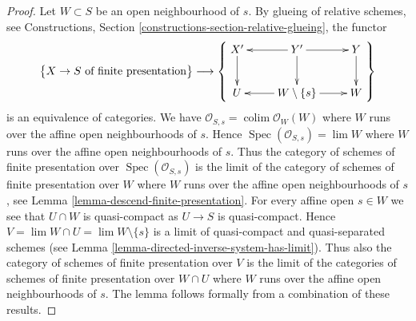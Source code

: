 \documentclass[10pt,a4paper]{amsart}
\theoremstyle{plain}
\theoremstyle{definition}
\theoremstyle{remark}
\numberwithin{equation}{subsection}
\def\lim{\mathop{\mathrm{lim}}\nolimits}
\def\colim{\mathop{\mathrm{colim}}\nolimits}
\def\Spec{\mathop{\mathrm{Spec}}}
\begin{document}
\begin{proof}
Let $W \subset S$ be an open neighbourhood of $s$. By
glueing of relative schemes, see
Constructions, Section \ref{constructions-section-relative-glueing},
the functor
$$
\left\{
\begin{matrix}
X \to S\text{ of finite presentation}
\end{matrix}
\right\}
\longrightarrow
\left\{
\vcenter{
\xymatrix{
X' \ar[d] & Y' \ar[d] \ar[l] \ar[r] & Y \ar[d] \\
U & W \setminus \{s\} \ar[l] \ar[r] & W
}
}
\right\}
$$
is an equivalence of categories. We have
$\mathcal{O}_{S, s} = \colim \mathcal{O}_W(W)$ where
$W$ runs over the affine open neighbourhoods of $s$.
Hence $\Spec(\mathcal{O}_{S, s}) = \lim W$ where $W$
runs over the affine open neighbourhoods of $s$.
Thus the category of schemes of finite presentation
over $\Spec(\mathcal{O}_{S, s})$ is the limit of the
category of schemes of finite presentation over
$W$ where $W$ runs over the affine open neighbourhoods
of $s$, see
Lemma \ref{lemma-descend-finite-presentation}.
For every affine open $s \in W$ we see that $U \cap W$
is quasi-compact as $U \to S$ is quasi-compact.
Hence $V = \lim W \cap U = \lim W \setminus \{s\}$ is a limit of
quasi-compact and quasi-separated schemes (see
Lemma \ref{lemma-directed-inverse-system-has-limit}).
Thus also the category of schemes of finite presentation
over $V$ is the limit of the
categories of schemes of finite presentation over
$W \cap U$ where $W$ runs over the affine open neighbourhoods
of $s$. The lemma follows formally from a combination
of these results.
\end{proof}
\end{document}
